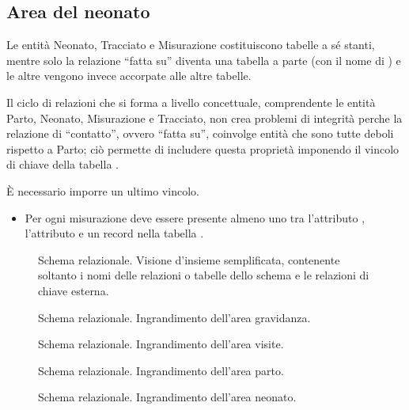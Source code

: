 \subsection{Area del neonato}
\label{logicalnewborn}

Le entità Neonato, Tracciato e Misurazione costituiscono tabelle a sé stanti, mentre solo la relazione \enquote{fatta su} diventa una tabella a parte (con il nome di ) e le altre vengono invece accorpate alle altre tabelle.

Il ciclo di relazioni che si forma a livello concettuale, comprendente le entità Parto, Neonato, Misurazione e Tracciato, non crea problemi di integrità perche la relazione di \enquote{contatto}, ovvero \enquote{fatta su}, coinvolge entità che sono tutte deboli rispetto a Parto; ciò permette di includere questa proprietà imponendo il vincolo di chiave della tabella .

È necessario imporre un ultimo vincolo.
\begin{itemize}
\item[\Con{}] Per ogni misurazione deve essere presente almeno uno tra l'attributo , l'attributo  e un record nella tabella .
\end{itemize}

\begin{figure}
    \centering
    
    \caption{Schema relazionale. Visione d'insieme semplificata, contenente soltanto i nomi delle relazioni o tabelle dello schema e le relazioni di chiave esterna.}
\label{completereldiagram}
\end{figure}

\begin{sidewaysfigure}
    \centering
    
    \caption{Schema relazionale. Ingrandimento dell'area gravidanza.}
\label{pregnancyreldiagram}
\end{sidewaysfigure}

\begin{sidewaysfigure}
    \centering
    
    \caption{Schema relazionale. Ingrandimento dell'area visite.}
\label{visitsreldiagram}
\end{sidewaysfigure}

\begin{sidewaysfigure}
    \centering
    
    \caption{Schema relazionale. Ingrandimento dell'area parto.}
\label{deliveryreldiagram}
\end{sidewaysfigure}

\begin{sidewaysfigure}
    \centering
    
    \caption{Schema relazionale. Ingrandimento dell'area neonato.}
\label{newbornreldiagram}
\end{sidewaysfigure}